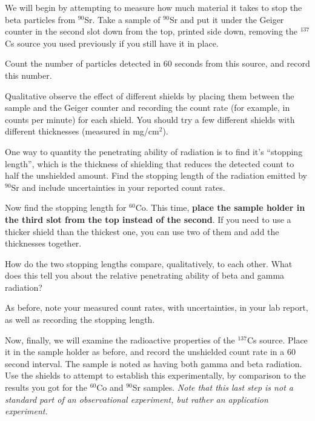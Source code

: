 \begin{steps}
	\item We will begin by attempting to measure how much material it takes to stop the beta particles from $^{90}$Sr.
	Take a sample of $^{90}$Sr and put it under the Geiger counter in the second slot down from the top, printed side down, removing the $^{137}$Cs source you used previously if you still have it in place.
	
	\item Count the number of particles detected in 60 seconds from this source, and record this number.
	
	\item Qualitative observe the effect of different shields by placing them between the sample and the Geiger counter and recording the count rate (for example, in counts per minute) for each shield.
	You should try a few different shields with different thicknesses (measured in mg/cm$^2$).
	
	\item One way to quantity the penetrating ability of radiation is to find it's ``stopping length'', which is the thickness of shielding that reduces the detected count to half the unshielded amount. Find the stopping length of the radiation emitted by $^{90}$Sr and include uncertainties in your reported count rates.

	\item Now find the stopping length for $^{60}$Co. This time, \textbf{place the sample holder in the third slot from the top instead of the second}. If you need to use a thicker shield than the thickest one, you can use two of them and add the thicknesses together.
	
	\item How do the two stopping lengths compare, qualitatively, to each other. What does this tell you about the relative penetrating ability of beta and gamma radiation?
	
	\item As before, note your measured count rates, with uncertainties, in your lab report, as well as recording the stopping length.
	
	\item Now, finally, we will examine the radioactive properties of the $^{137}$Cs source.
	Place it in the sample holder as before, and record the unshielded count rate in a 60 second interval.
	The sample is noted as having both gamma and beta radiation.
	Use the shields to attempt to establish this experimentally, by comparison to the results you got for the $^{60}$Co and $^{90}$Sr samples. \textit{Note that this last step is not a standard part of an observational experiment, but rather an application experiment.}
	
\end{steps}

